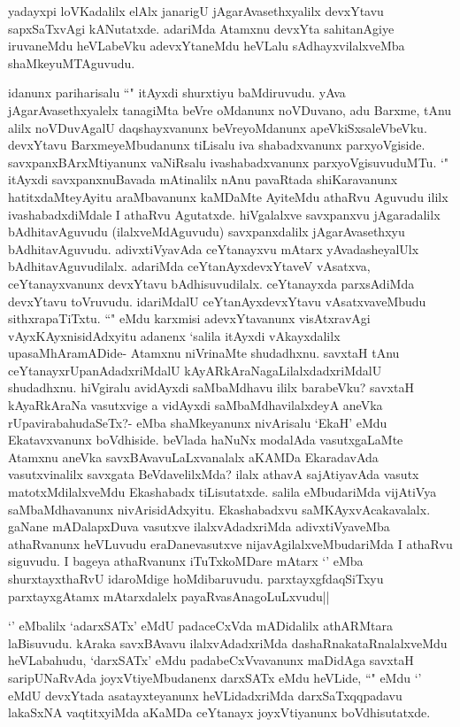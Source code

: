 
\begin{artha}
yadayxpi loVKadalilx elAlx janarigU jAgarAvasethxyalilx devxYtavu sapxSaTxvAgi kANutatxde. adariMda Atamxnu devxYta sahitanAgiye iruvaneMdu heVLabeVku adevxYtaneMdu heVLalu sAdhayxvilalxveMba shaMkeyuMTAguvudu.
\end{artha}

\begin{artha}
idanunx pariharisalu ``\stext " itAyxdi shurxtiyu baMdiruvudu. yAva jAgarAvasethxyalelx tanagiMta beVre oMdanunx noVDuvano, adu Barxme, tAnu alilx noVDuvAgalU daqshayxvanunx beVreyoMdanunx apeVkiSxsaleVbeVku. devxYtavu BarxmeyeMbudanunx tiLisalu iva shabadxvanunx parxyoVgiside. savxpanxBArxMtiyanunx vaNiRsalu ivashabadxvanunx parxyoVgisuvuduMTu. `\stext " itAyxdi savxpanxnuBavada mAtinalilx nAnu pavaRtada shiKaravanunx hatitxdaMteyAyitu araMbavanunx kaMDaMte AyiteMdu athaRvu Aguvudu ililx ivashabadxdiMdale I athaRvu Agutatxde. hiVgalalxve savxpanxvu jAgaradalilx bAdhitavAguvudu (ilalxveMdAguvudu) savxpanxdalilx jAgarAvasethxyu bAdhitavAguvudu. adivxtiVyavAda ceYtanayxvu mAtarx yAvadasheyalUlx bAdhitavAguvudilalx. adariMda ceYtanAyxdevxYtaveV vAsatxva, ceYtanayxvanunx devxYtavu bAdhisuvudilalx. ceYtanayxda parxsAdiMda devxYtavu toVruvudu. idariMdalU ceYtanAyxdevxYtavu vAsatxvaveMbudu sithxrapaTiTxtu. ``\stext" eMdu karxmisi adevxYtavanunx visAtxravAgi vAyxKAyxnisidAdxyitu adanenx `salila itAyxdi vAkayxdalilx upasaMhAramADide- Atamxnu niVrinaMte shudadhxnu. savxtaH tAnu ceYtanayxrUpanAdadxriMdalU kAyARkAraNagaLilalxdadxriMdalU shudadhxnu. hiVgiralu avidAyxdi saMbaMdhavu ililx barabeVku? savxtaH kAyaRkAraNa vasutxvige a vidAyxdi saMbaMdhavilalxdeyA aneVka rUpavirabahudaSeTx?- eMba shaMkeyanunx nivArisalu `EkaH' eMdu Ekatavxvanunx boVdhiside. beVlada haNuNx modalAda vasutxgaLaMte Atamxnu aneVka savxBAvavuLaLxvanalalx aKAMDa EkaradavAda vasutxvinalilx savxgata BeVdavelilxMda? ilalx athavA sajAtiyavAda vasutx matotxMdilalxveMdu Ekashabadx tiLisutatxde. salila eMbudariMda vijAtiVya saMbaMdhavanunx nivArisidAdxyitu. Ekashabadxvu saMKAyxvAcakavalalx. gaNane mADalapxDuva vasutxve ilalxvAdadxriMda adivxtiVyaveMba athaRvanunx heVLuvudu eraDanevasutxve nijavAgilalxveMbudariMda I athaRvu siguvudu. I bageya athaRvanunx iTuTxkoMDare mAtarx `\stext' eMba shurxtayxthaRvU idaroMdige hoMdibaruvudu. parxtayxgfdaqSiTxyu parxtayxgAtamx mAtarxdalelx payaRvasAnagoLuLxvudu||
\end{artha}%

\begin{artha}
`\stext' eMbalilx `adarxSATx' eMdU padaceCxVda mADidalilx athARMtara laBisuvudu. kAraka savxBAvavu ilalxvAdadxriMda dashaRnakataRnalalxveMdu heVLabahudu, `darxSATx' eMdu padabeCxVvavanunx maDidAga savxtaH saripUNaRvAda joyxVtiyeMbudanenx darxSATx eMdu heVLide, ``\stext" eMdu `\stext' eMdU devxYtada asatayxteyanunx heVLidadxriMda darxSaTxqqpadavu lakaSxNA vaqtitxyiMda aKaMDa ceYtanayx joyxVtiyanunx boVdhisutatxde. 
\end{artha}


